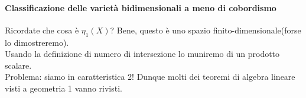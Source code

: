 \paragraph{Classificazione delle varietà bidimensionali a meno di cobordismo}
Ricordate che cosa è $\eta _1(X)$? Bene, questo è uno spazio finito-dimensionale(forse lo dimostreremo).\\
Usando la definizione di numero di intersezione lo muniremo di un prodotto scalare. \\
Problema: siamo in caratteristica 2! Dunque molti dei teoremi di algebra lineare visti a geometria 1 vanno rivisti.







